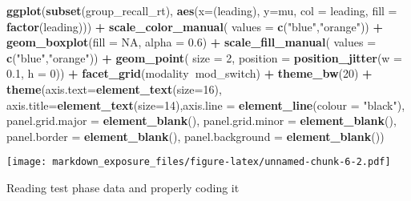 \documentclass[]{article}
\newenvironment{Shaded}{\begin{snugshade}}{\end{snugshade}}
\newcommand{\DataTypeTok}[1]{\textcolor[rgb]{0.13,0.29,0.53}{#1}}
\newcommand{\DecValTok}[1]{\textcolor[rgb]{0.00,0.00,0.81}{#1}}
\newcommand{\FloatTok}[1]{\textcolor[rgb]{0.00,0.00,0.81}{#1}}
\newcommand{\KeywordTok}[1]{\textcolor[rgb]{0.13,0.29,0.53}{\textbf{#1}}}
\newcommand{\NormalTok}[1]{#1}
\newcommand{\OperatorTok}[1]{\textcolor[rgb]{0.81,0.36,0.00}{\textbf{#1}}}
\newcommand{\OtherTok}[1]{\textcolor[rgb]{0.56,0.35,0.01}{#1}}
\newcommand{\StringTok}[1]{\textcolor[rgb]{0.31,0.60,0.02}{#1}}
\begin{document}
\begin{Shaded}
\begin{Highlighting}[]
\KeywordTok{ggplot}\NormalTok{(}\KeywordTok{subset}\NormalTok{(group_recall_rt), }\KeywordTok{aes}\NormalTok{(}\DataTypeTok{x=}\NormalTok{(leading), }\DataTypeTok{y=}\NormalTok{mu, }\DataTypeTok{col =}\NormalTok{ leading, }\DataTypeTok{fill =} \KeywordTok{factor}\NormalTok{(leading))) }\OperatorTok{+}\StringTok{ }
\StringTok{  }\KeywordTok{scale_color_manual}\NormalTok{( }\DataTypeTok{values =}  \KeywordTok{c}\NormalTok{(}\StringTok{"blue"}\NormalTok{,}\StringTok{"orange"}\NormalTok{)) }\OperatorTok{+}\StringTok{ }\KeywordTok{geom_boxplot}\NormalTok{(}\DataTypeTok{fill =} \OtherTok{NA}\NormalTok{, }\DataTypeTok{alpha =} \FloatTok{0.6}\NormalTok{) }\OperatorTok{+}\StringTok{ }\KeywordTok{scale_fill_manual}\NormalTok{( }\DataTypeTok{values =}  \KeywordTok{c}\NormalTok{(}\StringTok{"blue"}\NormalTok{,}\StringTok{"orange"}\NormalTok{)) }\OperatorTok{+}\StringTok{ }\KeywordTok{geom_point}\NormalTok{( }\DataTypeTok{size =} \DecValTok{2}\NormalTok{,  }\DataTypeTok{position =} \KeywordTok{position_jitter}\NormalTok{(}\DataTypeTok{w =} \FloatTok{0.1}\NormalTok{, }\DataTypeTok{h =} \DecValTok{0}\NormalTok{)) }\OperatorTok{+}\StringTok{ }\KeywordTok{facet_grid}\NormalTok{(modality}\OperatorTok{~}\NormalTok{mod_switch) }\OperatorTok{+}\StringTok{ }
\StringTok{  }\KeywordTok{theme_bw}\NormalTok{(}\DecValTok{20}\NormalTok{) }\OperatorTok{+}\StringTok{ }\KeywordTok{theme}\NormalTok{(}\DataTypeTok{axis.text=}\KeywordTok{element_text}\NormalTok{(}\DataTypeTok{size=}\DecValTok{16}\NormalTok{), }\DataTypeTok{axis.title=}\KeywordTok{element_text}\NormalTok{(}\DataTypeTok{size=}\DecValTok{14}\NormalTok{),}\DataTypeTok{axis.line =} \KeywordTok{element_line}\NormalTok{(}\DataTypeTok{colour =} \StringTok{"black"}\NormalTok{),}
                       \DataTypeTok{panel.grid.major =} \KeywordTok{element_blank}\NormalTok{(),}
                       \DataTypeTok{panel.grid.minor =} \KeywordTok{element_blank}\NormalTok{(),}
                       \DataTypeTok{panel.border =} \KeywordTok{element_blank}\NormalTok{(),}
                       \DataTypeTok{panel.background =} \KeywordTok{element_blank}\NormalTok{())}
\end{Highlighting}
\end{Shaded}

\texttt{[image: markdown\_exposure\_files/figure-latex/unnamed-chunk-6-2.pdf]}

Reading test phase data and properly coding it
\end{document}
